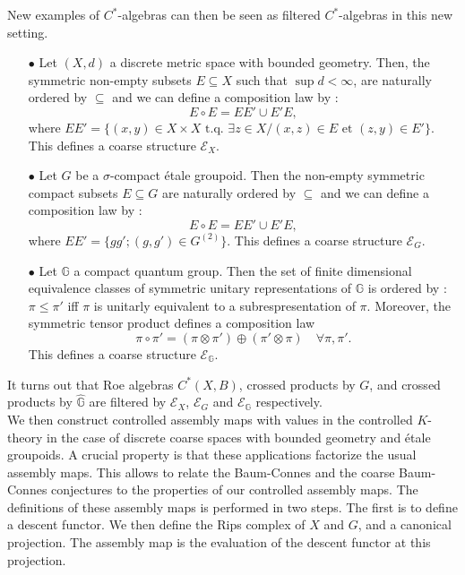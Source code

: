 New examples of $C^*$-algebras can then be seen as filtered $C^*$-algebras in this new setting. \\

\begin{itemize} 
\item[$\bullet$] Let $(X,d)$ a discrete metric space with bounded geometry. Then, the symmetric non-empty subsets $E\subseteq X$ such that $\sup d<\infty$, are naturally ordered by $\subseteq$ and we can define a composition law by :
\[E\circ E = EE'\cup E'E,\]
where $EE' = \{(x,y)\in X\times X \text{ t.q. }\exists z\in X / (x,z)\in E \text{ et }(z,y)\in E'\}$. This defines a coarse structure $\mathcal E_X$.
\item[$\bullet$] Let $G$ be a $\sigma$-compact étale groupoid. Then the non-empty symmetric compact subsets $E\subseteq G$ are naturally ordered by $\subseteq$ and we can define a composition law by :
\[E\circ E = EE'\cup E'E,\]
where $EE' = \{gg' ; (g,g')\in G^{(2)}\}$. This defines a coarse structure $\mathcal E_G$.
\item[$\bullet$] Let $\mathbb G$ a compact quantum group. Then the set of finite dimensional equivalence classes of symmetric unitary representations of $\mathbb G$ is ordered by : $\pi\leq \pi'$ iff $\pi$ is unitarly equivalent to a subrespresentation of $\pi$. Moreover, the symmetric tensor product defines a composition law
\[\pi\circ \pi' = (\pi\otimes\pi' )\oplus (\pi'\otimes \pi) \quad \forall \pi,\pi'.\] This defines a coarse structure $\mathcal E_{\mathbb G}$.\\
\end{itemize} 

It turns out that Roe algebras $C^*(X,B)$, crossed products by $G$, and crossed products by $\hat{\mathbb G}$ are filtered by $\mathcal E_X$, $\mathcal E_G$ and $\mathcal E_{\mathbb G}$ respectively.\\

We then construct controlled assembly maps with values in the controlled $K$-theory in the case of discrete coarse spaces with bounded geometry and étale groupoids. A crucial property is that these applications factorize the usual assembly maps. This allows to relate the Baum-Connes and the coarse Baum-Connes conjectures to the properties of our controlled assembly maps. The definitions of these assembly maps is performed in two steps. The first is to define a descent functor. We then define the Rips complex of $X$ and $G$, and a canonical projection. The assembly map is the evaluation of the descent functor at this projection. \\

